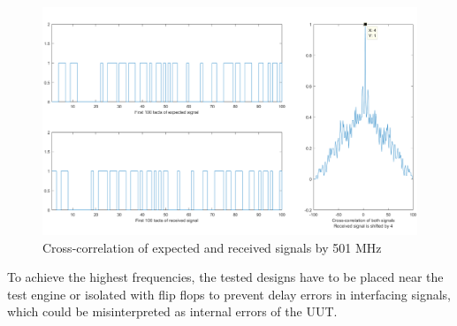 \begin{figure}[h]
\centering
\includegraphics[width=\textwidth]{figures/Xcorr.png}
\caption{Cross-correlation of expected and received signals by 501 MHz}
\label{fig:xcorr}
\end{figure}

To achieve the highest frequencies, the tested designs have to be placed near the test engine or isolated with flip flops to prevent delay errors in interfacing signals, which could be misinterpreted as internal errors of the UUT.
